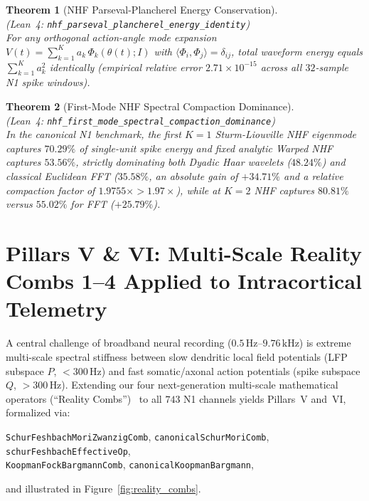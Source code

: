 \documentclass[11pt,letterpaper]{article}
\newcommand{\lean}[1]{\nolinkurl{#1}}
\newtheorem{theorem}{Theorem}[section]
\theoremstyle{definition}
\begin{document}
\begin{theorem}[NHF Parseval-Plancherel Energy Conservation]
\label{thm:t11}
~\\
(\emph{Lean~4:} \lean{nhf_parseval_plancherel_energy_identity})\\
For any orthogonal action-angle mode expansion $V(t) = \sum_{k=1}^K a_k\,\Phi_k(\theta(t); I)$ with $\langle\Phi_i,\Phi_j\rangle = \delta_{ij}$, total waveform energy equals $\sum_{k=1}^K a_k^2$ identically (empirical relative error $2.71\times 10^{-15}$ across all $32$-sample N1 spike windows).
\end{theorem}

\begin{theorem}[First-Mode NHF Spectral Compaction Dominance]
\label{thm:t12}
~\\
(\emph{Lean~4:} \lean{nhf_first_mode_spectral_compaction_dominance})\\
In the canonical N1 benchmark, the first $K=1$ Sturm-Liouville NHF eigenmode captures $70.29\%$ of single-unit spike energy and fixed analytic Warped NHF captures $53.56\%$, strictly dominating both Dyadic Haar wavelets ($48.24\%$) and classical Euclidean FFT ($35.58\%$, an absolute gain of $+34.71\%$ and a relative compaction factor of $1.9755\times > 1.97\times$), while at $K=2$ NHF captures $80.81\%$ versus $55.02\%$ for FFT ($+25.79\%$).
\end{theorem}

\section{Pillars V \& VI: Multi-Scale Reality Combs 1--4 Applied to Intracortical Telemetry}

A central challenge of broadband neural recording ($0.5\,\text{Hz}\text{--}9.76\,\text{kHz}$) is extreme multi-scale spectral stiffness between slow dendritic local field potentials (LFP subspace $P$, $<300\,\text{Hz}$) and fast somatic/axonal action potentials (spike subspace $Q$, $>300\,\text{Hz}$). Extending our four next-generation multi-scale mathematical operators (``Reality Combs'')~\cite{solidsf_reality_comb2026} to all $743$ N1 channels yields Pillars~V and~VI, formalized via:
\begin{center}
\footnotesize
\lean{SchurFeshbachMoriZwanzigComb}, \quad \lean{canonicalSchurMoriComb}, \quad \lean{schurFeshbachEffectiveOp},\\
\lean{KoopmanFockBargmannComb}, \quad \lean{canonicalKoopmanBargmann},
\end{center}
and illustrated in Figure~\ref{fig:reality_combs}.
\end{document}
